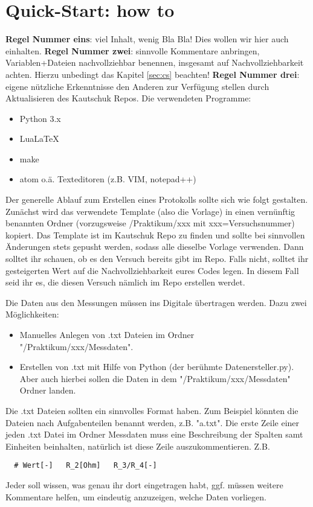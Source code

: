 \section{Quick-Start: how to}
\label{sec:qs}

\textbf{Regel Nummer eins}: viel Inhalt, wenig Bla Bla! Dies wollen wir hier auch einhalten. \textbf{Regel Nummer zwei}: sinnvolle Kommentare anbringen, Variablen+Dateien nachvollziehbar benennen, insgesamt auf Nachvollziehbarkeit achten. Hierzu unbedingt das Kapitel \ref{sec:cs} beachten! \textbf{Regel Nummer drei}: eigene nützliche Erkenntnisse den Anderen zur Verfügung stellen durch Aktualisieren des Kautschuk Repos. Die verwendeten Programme:
\begin{itemize}
  \item Python 3.x
  \item LuaLaTeX
  \item make
  \item atom o.ä. Texteditoren (z.B. VIM, notepad++)
\end{itemize}
Der generelle Ablauf zum Erstellen eines Protokolls sollte sich wie folgt gestalten. Zunächst wird das verwendete Template (also die Vorlage) in einen vernünftig benannten Ordner (vorzugsweise /Praktikum/xxx  mit xxx=Versuchsnummer) kopiert. Das Template ist im Kautschuk Repo zu finden und sollte bei sinnvollen Änderungen stets gepusht werden, sodass alle dieselbe Vorlage verwenden. Dann solltet ihr schauen, ob es den Versuch bereits gibt im Repo. Falls nicht, solltet ihr gesteigerten Wert auf die Nachvollziehbarkeit eures Codes legen. In diesem Fall seid ihr es, die diesen Versuch nämlich im Repo erstellen werdet.

Die Daten aus den Messungen müssen ins Digitale übertragen werden. Dazu zwei Möglichkeiten:
\begin{itemize}
  \item Manuelles Anlegen von .txt Dateien im Ordner "/Praktikum/xxx/Messdaten".
  \item Erstellen von .txt mit Hilfe von Python (der berühmte Datenersteller.py). Aber auch hierbei sollen die Daten in dem "/Praktikum/xxx/Messdaten" Ordner landen.
\end{itemize}
Die .txt Dateien sollten ein sinnvolles Format haben. Zum Beispiel könnten die Dateien nach Aufgabenteilen benannt werden, z.B. "a.txt". Die erste Zeile einer jeden .txt Datei im Ordner Messdaten muss eine Beschreibung der Spalten samt Einheiten beinhalten, natürlich ist diese Zeile auszukommentieren. Z.B.
\begin{lstlisting}
  # Wert[-]   R_2[Ohm]   R_3/R_4[-]
\end{lstlisting}
Jeder soll wissen, was genau ihr dort eingetragen habt, ggf. müssen weitere Kommentare helfen, um eindeutig anzuzeigen, welche Daten vorliegen.

